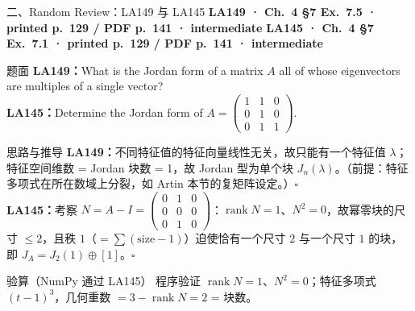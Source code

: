 \documentclass[aspectratio=169,10pt,fontset=none]{ctexbeamer}
\newcommand{\ex}[1]{\textcolor{accent}{\footnotesize\bfseries #1}}
\begin{document}
\begin{frame}[t]{二、Random Review：LA149 与 LA145}
  \leavevmode\ex{LA149 · Ch.~4 §7 Ex.~7.5 · printed p.~129 / PDF p.~141 · intermediate}\quad
  \ex{LA145 · Ch.~4 §7 Ex.~7.1 · printed p.~129 / PDF p.~141 · intermediate}
  \begin{block}{\footnotesize 题面}
    \scriptsize \textbf{LA149：}What is the Jordan form of a matrix $A$ all of whose eigenvectors are multiples of a single vector?\\
    \textbf{LA145：}Determine the Jordan form of $A=\begin{pmatrix}1&1&0\\0&1&0\\0&1&1\end{pmatrix}$.
  \end{block}
  \begin{exampleblock}{\footnotesize 思路与推导}
    \scriptsize
    \textbf{LA149：}不同特征值的特征向量线性无关，故只能有一个特征值 $\lambda$；特征空间维数 = Jordan 块数 = 1，故 Jordan 型为单个块 $J_n(\lambda)$。（前提：特征多项式在所在数域上分裂，如 Artin 本节的复矩阵设定。）$\square$\\[3pt]
    \textbf{LA145：}考察 $N=A-I=\begin{pmatrix}0&1&0\\0&0&0\\0&1&0\end{pmatrix}$：$\operatorname{rank}N=1$、$N^2=0$，故幂零块的尺寸 $\le2$，且秩 $1$（$=\sum(\text{size}-1)$）迫使恰有一个尺寸 $2$ 与一个尺寸 $1$ 的块，即 $J_A=J_2(1)\oplus[1]$。$\square$
  \end{exampleblock}
  \begin{block}{\footnotesize 验算（NumPy 通过 LA145）}
    \scriptsize 程序验证 $\operatorname{rank}N=1$、$N^2=0$；特征多项式 $(t-1)^3$，几何重数 $=3-\operatorname{rank}N=2$ = 块数。
  \end{block}
\end{frame}
\end{document}
